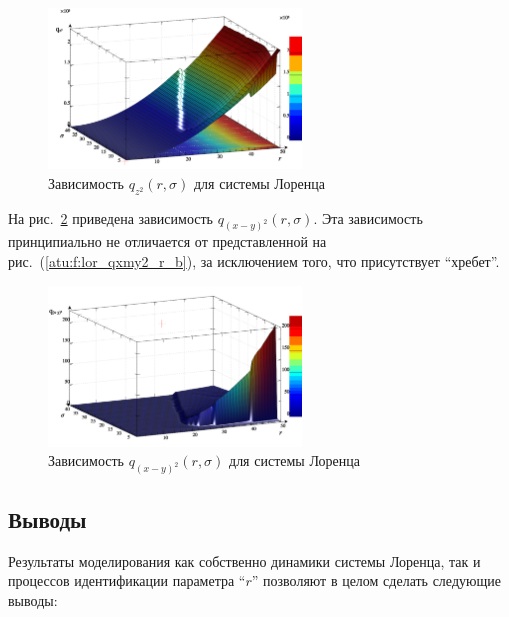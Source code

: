 \begin{figure}[h!]
  \centerline{  \includegraphics[width=0.60\textwidth]{p/cha/lor/q2d/lor_qz2_r_sigma.png}  }
  \caption{Зависимость $q_{z^2}(r,\sigma)$ для системы Лоренца}
  \label{atu:f:lor_qz2_r_sigma}
\end{figure}

На рис.~\ref{atu:f:lor_qxmy2_r_sigma} приведена зависимость
$q_{(x-y)^2}(r,\sigma)$. Эта зависимость принципиально не отличается
от представленной на рис.~(\ref{atu:f:lor_qxmy2_r_b}),
за исключением того, что присутствует ``хребет''.

\begin{figure}[h!]
  \centerline{  \includegraphics[width=0.60\textwidth]{p/cha/lor/q2d/lor_qxmy2_r_sigma.png}  }
  \caption{Зависимость $q_{(x-y)^2}(r,\sigma)$ для системы Лоренца}
  \label{atu:f:lor_qxmy2_r_sigma}
\end{figure}

\subsection{Выводы}

Результаты моделирования как собственно динамики
системы Лоренца,
так и процессов идентификации параметра ``$r$''
позволяют в целом сделать следующие выводы:

